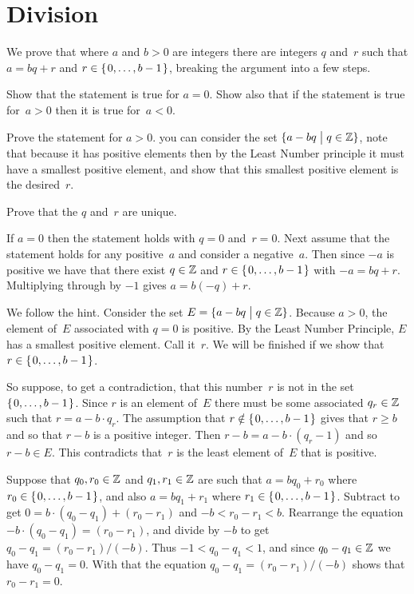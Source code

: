 \documentclass{ibl}
\begin{document}
\section{Division}
\begin{ex}  We prove that 
where $a$ and $b>0$ are integers there are integers $q$ and~$r$
such that $a=bq+r$ and $r\in\mbox{$\{\hspace{0.1em}0,\ldots,b-1\hspace{0.1em}\}$}$,
breaking the argument into a few steps.
\begin{exes} 
\item Show that the statement is true for $a=0$.
  Show also that if the statement is true for~$a>0$ then it is true
  for~$a<0$. 
\item Prove the statement for $a>0$.
  \hint you can consider the set $\{a-bq \bigm| q\in\mathbb{Z}\}$, note that
  because it has positive elements then by the Least Number principle
  it must have a smallest positive
  element, and show that this smallest positive element is the desired~$r$.
\item
  Prove that the $q$ and~$r$ are unique.
\end{exes}
\begin{ans}
\begin{exes}
\item
  If $a=0$ then the statement holds with $q=0$ and~$r=0$.
  Next assume that the statement holds for any positive~$a$ 
  and consider a negative~$a$.
  Then since $-a$ is positive we have that there exist 
  $q\in\mathbb{Z}$ and $r\in\mbox{$\{\hspace{0.1em}0,\ldots,b-1\hspace{0.1em}\}$}$ with $-a=bq+r$.
  Multiplying through by $-1$ gives $a=b(-q)+r$.
\item We follow the hint.
  Consider the set $E=\{a-bq \bigm| q\in\mathbb{Z}\}$.
  Because $a>0$, the element of~$E$ associated with $q=0$ is positive.
  By the Least Number Principle, $E$ has a smallest positive element.
  Call it~$r$.
  We will be finished if we show that~$r\in\mbox{$\{\hspace{0.1em}0, \ldots , b-1\hspace{0.1em}\}$}$.

  So suppose, to get a contradiction, that this number~$r$ is not in the set 
  $\mbox{$\{\hspace{0.1em}0, \ldots , b-1\hspace{0.1em}\}$}$.
  Since $r$ is an element of~$E$ there must be some associated
  $q_r\in\mathbb{Z}$ such that $r=a-b\cdot q_r$.
  The assumption that $r\notin\mbox{$\{\hspace{0.1em}0, \ldots , b-1\hspace{0.1em}\}$}$ gives that $r\geq b$
  and so that $r-b$ is a positive integer.
  Then $r-b=a-b\cdot (q_r-1)$ and so $r-b\in E$.
  This contradicts that~$r$ is the least element of~$E$ that is positive.
\item Suppose that $q_0,r_0\in\mathbb{Z}$ and $q_1,r_1\in\mathbb{Z}$ are such that
  $a=bq_0+r_0$ where $r_0\in\mbox{$\{\hspace{0.1em}0, \ldots, b-1\hspace{0.1em}\}$}$, and also
  $a=bq_1+r_1$ where $r_1\in\mbox{$\{\hspace{0.1em}0, \ldots, b-1\hspace{0.1em}\}$}$.
  Subtract to get $0=b\cdot(q_0-q_1)+(r_0-r_1)$ and $-b<r_0-r_1<b$.
  Rearrange the equation $-b\cdot(q_0-q_1)=(r_0-r_1)$,
  and divide by $-b$ to get $q_0-q_1=(r_0-r_1)/(-b)$.
  Thus  $-1<q_0-q_1<1$, and since $q_0-q_1\in\mathbb{Z}$ we have $q_0-q_1=0$.
  With that the equation $q_0-q_1=(r_0-r_1)/(-b)$ shows that $r_0-r_1=0$.
\end{exes}
\end{ans}
\end{ex}
\end{document}
